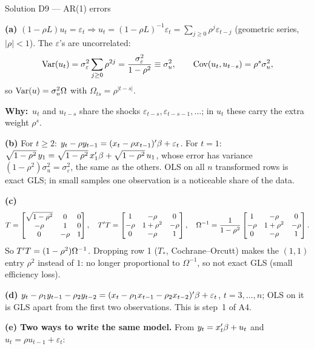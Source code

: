 \documentclass[11pt]{article}
\newcommand{\step}[1]{\par\smallskip\noindent\textbf{\textcolor{qnavy}{#1}}\quad\ignorespaces}
\newcommand{\Why}{\textbf{\textcolor{whyline}{Why:}}\ }
\begin{document}
\begin{solbox}{Solution D9 --- AR(1) errors}
\step{(a)} $(1 - \rho L)u_{t} = \varepsilon_{t} \Rightarrow u_{t} = (1-\rho L)^{-1}\varepsilon_{t}
= \sum_{j\ge0}\rho^{j}\varepsilon_{t-j}$ (geometric series, $|\rho| < 1$). The $\varepsilon$'s are uncorrelated:
\[
  \operatorname{Var}(u_{t}) = \sigma_{\varepsilon}^{2}\sum_{j\ge0}\rho^{2j} = \frac{\sigma_{\varepsilon}^{2}}{1-\rho^{2}} \equiv \sigma_{u}^{2},
  \qquad \operatorname{Cov}(u_{t},u_{t-s}) = \rho^{s}\sigma_{u}^{2},
\]
so $\operatorname{Var}(u) = \sigma_{u}^{2}\Omega$ with $\Omega_{ts} = \rho^{|t-s|}$.
\begin{why}\Why $u_{t}$ and $u_{t-s}$ share the shocks $\varepsilon_{t-s}, \varepsilon_{t-s-1},\dots$; in $u_{t}$
these carry the extra weight $\rho^{s}$.\end{why}
\step{(b)} For $t \ge 2$: $y_{t} - \rho y_{t-1} = (x_{t} - \rho x_{t-1})^{\prime}\beta + \varepsilon_{t}$.
For $t = 1$: $\sqrt{1-\rho^{2}}\,y_{1} = \sqrt{1-\rho^{2}}\,x_{1}^{\prime}\beta + \sqrt{1-\rho^{2}}\,u_{1}$, whose error
has variance $(1-\rho^{2})\sigma_{u}^{2} = \sigma_{\varepsilon}^{2}$, the same as the others. OLS on all $n$
transformed rows is exact GLS; in small samples one observation is a noticeable share of the data.
\step{(c)}
\[
  T = \begin{bmatrix} \sqrt{1-\rho^{2}} & 0 & 0 \\ -\rho & 1 & 0 \\ 0 & -\rho & 1\end{bmatrix},\quad
  T^{\prime} T = \begin{bmatrix} 1 & -\rho & 0 \\ -\rho & 1+\rho^{2} & -\rho \\ 0 & -\rho & 1\end{bmatrix},\quad
  \Omega^{-1} = \frac{1}{1-\rho^{2}}\begin{bmatrix} 1 & -\rho & 0 \\ -\rho & 1+\rho^{2} & -\rho \\ 0 & -\rho & 1\end{bmatrix}.
\]
So $T^{\prime} T = (1-\rho^{2})\Omega^{-1}$. Dropping row 1 ($T_{*}$, Cochrane--Orcutt) makes the
$(1,1)$ entry $\rho^{2}$ instead of $1$: no longer proportional to $\Omega^{-1}$, so not exact GLS (small efficiency loss).
\step{(d)} $y_{t} - \rho_{1}y_{t-1} - \rho_{2}y_{t-2} = (x_{t} - \rho_{1}x_{t-1} - \rho_{2}x_{t-2})^{\prime}\beta + \varepsilon_{t}$,
$t = 3,\dots,n$; OLS on it is GLS apart from the first two observations. This is step~1 of A4.
\step{(e) Two ways to write the same model.} From $y_{t} = x_{t}^{\prime}\beta + u_{t}$ and $u_{t} = \rho u_{t-1} + \varepsilon_{t}$:

\end{solbox}
\end{document}
